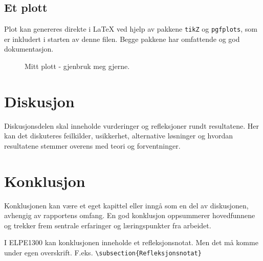 \documentclass[11pt,a4paper,twocolumn]{article}
\begin{document}
\subsection{Et plott}
Plot kan genereres direkte i \LaTeX{} ved hjelp av pakkene \verb|tikZ| og \verb|pgfplots|, som er inkludert i starten av denne filen. Begge pakkene har omfattende og god dokumentasjon.
% 
\begin{figure}[htb] %
\centering
{}
\caption{Mitt plott - gjenbruk meg gjerne.}
\label{fig:plot}
\end{figure}



\section{Diskusjon}

Diskusjonsdelen skal inneholde vurderinger og refleksjoner rundt resultatene. Her kan det diskuteres feilkilder, usikkerhet, alternative løsninger og hvordan resultatene stemmer overens med teori og forventninger.


\section{Konklusjon}

Konklusjonen kan være et eget kapittel eller inngå som en del av diskusjonen, avhengig av rapportens omfang. En god konklusjon oppsummerer hovedfunnene og trekker frem sentrale erfaringer og læringspunkter fra arbeidet.


I ELPE1300 kan konklusjonen inneholde et refleksjonsnotat. Men det må komme under egen overskrift. F.eks. \verb=\subsection{Refleksjonsnotat}=
\end{document}
